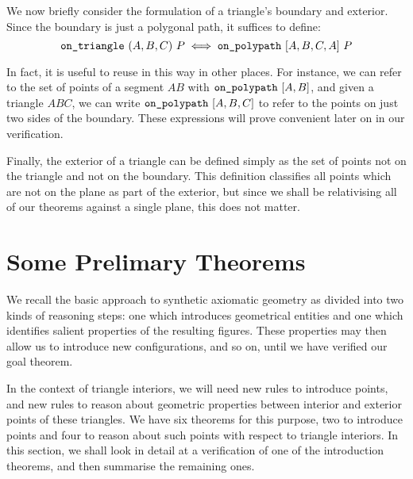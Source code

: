 We now briefly consider the formulation of a triangle's boundary and exterior. Since the boundary is just a polygonal path, it suffices to define:
\begin{equation}\label{eq:onTriangleDef}
\code{on\_triangle}\ (A,B,C)\ P \iff \code{on\_polypath}\ [A,B,C,A]\ P
\end{equation}

In fact, it is useful to reuse  in this way in other places. For instance, we can refer to the set of points of a segment $AB$ with $\texttt{on\_polypath}\ [A,B]$, and given a triangle $ABC$, we can write $\code{on\_polypath}\ [A,B,C]$ to refer to the points on just two sides of the boundary. These expressions will prove convenient later on in our verification.

Finally, the exterior of a triangle can be defined simply as the set of points not on the triangle and not on the boundary. This definition classifies all points which are not on the plane as part of the exterior, but since we shall be relativising all of our theorems against a single plane, this does not matter.

\section{Some Prelimary Theorems}
We recall the basic approach to synthetic axiomatic geometry as divided into two kinds of reasoning steps: one which introduces geometrical entities and one which identifies salient properties of the resulting figures. These properties may then allow us to introduce new configurations, and so on, until we have verified our goal theorem. 

In the context of triangle interiors, we will need new rules to introduce points, and new rules to reason about geometric properties between interior and exterior points of these triangles. We have six theorems for this purpose, two to introduce points and four to reason about such points with respect to triangle interiors. In this section, we shall look in detail at a verification of one of the introduction theorems, and then summarise the remaining ones.

